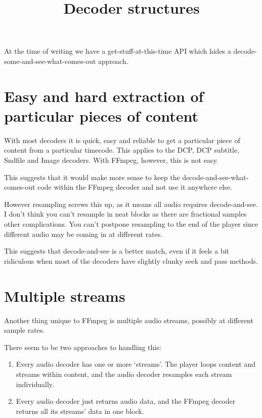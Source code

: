 \documentclass{article}
\title{Decoder structures}
\author{}
\date{}
\begin{document}
\maketitle

At the time of writing we have a get-stuff-at-this-time API which
hides a decode-some-and-see-what-comes-out approach.

\section{Easy and hard extraction of particular pieces of content}

With most decoders it is quick, easy and reliable to get a particular
piece of content from a particular timecode.  This applies to the DCP,
DCP subtitle, Sndfile and Image decoders.  With FFmpeg, however, this is not easy.

This suggests that it would make more sense to keep the
decode-and-see-what-comes-out code within the FFmpeg decoder and not
use it anywhere else.

However resampling screws this up, as it means all audio requires
decode-and-see.  I don't think you can't resample in neat blocks as
there are fractional samples other complications.  You can't postpone
resampling to the end of the player since different audio may be
coming in at different rates.

This suggests that decode-and-see is a better match, even if it feels
a bit ridiculous when most of the decoders have slightly clunky seek
and pass methods.


\section{Multiple streams}

Another thing unique to FFmpeg is multiple audio streams, possibly at
different sample rates.

There seem to be two approaches to handling this:

\begin{enumerate}
\item Every audio decoder has one or more `streams'.  The player loops
  content and streams within content, and the audio decoder resamples
  each stream individually.
\item Every audio decoder just returns audio data, and the FFmpeg
  decoder returns all its streams' data in one block.
\end{enumerate}
\end{document}
